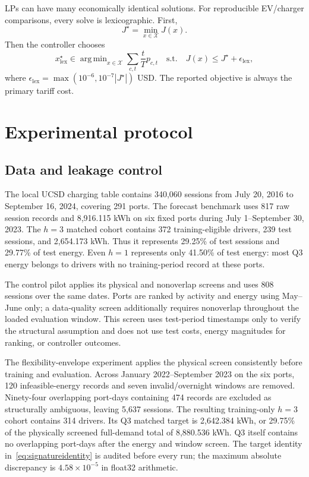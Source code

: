 \documentclass[11pt]{article}
\DeclareMathOperator*{\argmin}{arg\,min}
\begin{document}
LPs can have many economically identical solutions.  For reproducible
EV/charger comparisons, every solve is lexicographic.  First,
\[
 J^\star=\min_{x\in\mathcal X}J(x).
\]
Then the controller chooses
\begin{equation}
 x^\star_{\mathrm{lex}}\in\argmin_{x\in\mathcal X}
 \sum_{c,t}\frac{t}{T}p_{c,t}
 \quad\text{s.t.}\quad
 J(x)\le J^\star+\epsilon_{\mathrm{lex}},             \label{eq:lex}
\end{equation}
where
\(\epsilon_{\mathrm{lex}}=\max(10^{-6},10^{-7}|J^\star|)\) USD.  The reported
objective is always the primary tariff cost.

\section{Experimental protocol}
\subsection{Data and leakage control}

The local UCSD charging table contains 340,060 sessions from July 20, 2016 to
September 16, 2024, covering 291 ports.  The forecast benchmark uses 817 raw
session records and 8,916.115 kWh on six fixed ports during July
1--September 30, 2023.  The \(h=3\) matched cohort contains 372
training-eligible drivers, 239 test sessions, and 2,654.173 kWh.  Thus it
represents 29.25\% of test sessions and 29.77\% of test energy.  Even \(h=1\)
represents only 41.50\% of test energy: most Q3 energy belongs to drivers with
no training-period record at these ports.

The control pilot applies its physical and nonoverlap screens and uses 808
sessions over the same dates.  Ports are ranked by
activity and energy using May--June only; a data-quality screen additionally
requires nonoverlap throughout the loaded evaluation window.  This screen uses
test-period timestamps only to verify the structural assumption and does not
use test costs, energy magnitudes for ranking, or controller outcomes.

The flexibility-envelope experiment applies the physical screen consistently
before training and evaluation.  Across January 2022--September 2023 on the
six ports, 120 infeasible-energy records and seven invalid/overnight windows
are removed.  Ninety-four overlapping port-days containing 474 records are
excluded as structurally ambiguous, leaving 5,637 sessions.  The resulting
training-only \(h=3\) cohort contains 314 drivers.  Its Q3 matched target is
2,642.384 kWh, or 29.75\% of the physically screened full-demand total of
8,880.536 kWh.  Q3 itself contains no overlapping port-days after the energy
and window screen.  The target identity in~\eqref{eq:signatureidentity} is
audited before every run; the maximum absolute discrepancy is
\(4.58\times10^{-5}\) in float32 arithmetic.
\end{document}
